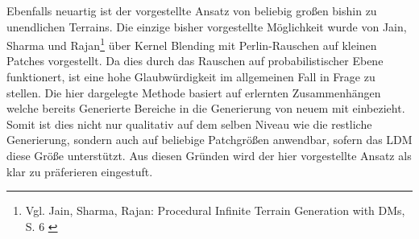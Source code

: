 Ebenfalls neuartig ist der vorgestellte Ansatz von beliebig großen bishin zu unendlichen Terrains. Die einzige bisher vorgestellte Möglichkeit wurde von Jain, Sharma und Rajan\footnote{
    Vgl. Jain, Sharma, Rajan: Procedural Infinite Terrain Generation with DMs, S. 6
    \cite{jain2022adaptive}
} über Kernel Blending mit Perlin-Rauschen auf kleinen Patches vorgestellt. Da dies durch das Rauschen auf probabilistischer Ebene funktionert, ist eine hohe Glaubwürdigkeit im allgemeinen Fall in Frage zu stellen. Die hier dargelegte Methode basiert auf erlernten Zusammenhängen welche bereits Generierte Bereiche in die Generierung von neuem mit einbezieht. Somit ist dies nicht nur qualitativ auf dem selben Niveau wie die restliche Generierung, sondern auch auf beliebige Patchgrößen anwendbar, sofern das LDM diese Größe unterstützt. Aus diesen Gründen wird der hier vorgestellte Ansatz als klar zu präferieren eingestuft.  

